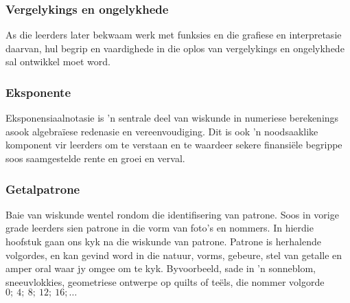 \subsubsection{Vergelykings en ongelykhede}
As die leerders later bekwaam werk met funksies en die grafiese en interpretasie daarvan, hul begrip en vaardighede in die oplos van vergelykings en ongelykhede sal ontwikkel moet word.

\subsubsection{Eksponente}
Eksponensiaalnotasie is 'n sentrale deel van wiskunde in numeriese berekenings asook algebraïese redenasie en vereenvoudiging. Dit is ook 'n noodsaaklike komponent vir leerders om te verstaan ​​en te waardeer sekere finansiële begrippe soos saamgestelde rente en groei en verval.

\subsubsection{Getalpatrone}
Baie van wiskunde wentel rondom die identifisering van patrone. Soos in vorige grade leerders sien patrone in die vorm van foto's en nommers. In hierdie hoofstuk gaan ons kyk na die wiskunde van patrone. Patrone is herhalende volgordes, en kan gevind word in die natuur, vorms, gebeure, stel van getalle en amper oral waar jy omgee om te kyk. Byvoorbeeld, sade in 'n sonneblom, sneeuvlokkies, geometriese ontwerpe op quilts of teëls, die nommer volgorde $0; ~4;~ 8;~ 12; ~16; \ldots$

